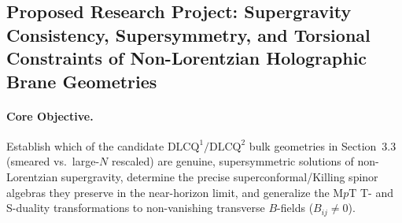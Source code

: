 \documentclass[11pt,a4paper]{article}
\begin{document}
\subsection*{Proposed Research Project: Supergravity Consistency, Supersymmetry, and Torsional Constraints of Non-Lorentzian Holographic Brane Geometries}

\paragraph{Core Objective.}
Establish which of the candidate $\text{DLCQ}^1/\text{DLCQ}^2$ bulk geometries in Section~3.3 (smeared vs.\ large-$N$ rescaled) are genuine, supersymmetric solutions of non-Lorentzian supergravity, determine the precise superconformal/Killing spinor algebras they preserve in the near-horizon limit, and generalize the M$p$T T- and S-duality transformations to non-vanishing transverse $B$-fields ($B_{ij} \neq 0$).
\end{document}
